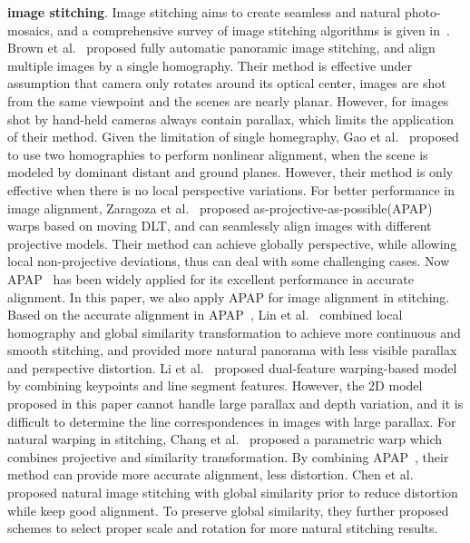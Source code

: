 \documentclass[10pt,journal,compsoc]{IEEEtran}
\begin{document}
\textbf{image stitching}.
Image stitching aims to create seamless and natural photo-mosaics, and a comprehensive survey of image stitching algorithms is given in~\cite{journals/ftcgv/Szeliski06}.
Brown et al.~\cite{journals/ijcv/BrownL07} proposed fully automatic panoramic image stitching, and align multiple images by a single homography. Their method is effective under assumption that camera only rotates around its optical center, images are shot from the same viewpoint and the scenes are nearly planar. However, for images shot by hand-held cameras always contain parallax, which limits the application of their method.
Given the limitation of single homegraphy, Gao et al.~\cite{conf/CVPR/GaoKB11} proposed to use two homographies to perform nonlinear alignment, when the scene is modeled by dominant distant and ground planes. However, their method is only effective when there is no local perspective variations.
For better performance in image alignment, Zaragoza et al.~\cite{journals/pami/ZaragozaCTBS14} proposed as-projective-as-possible(APAP) warps based on moving DLT, and can seamlessly align images with different projective models. Their method can achieve globally perspective, while allowing local non-projective deviations, thus can deal with some challenging cases. Now APAP~\cite{journals/pami/ZaragozaCTBS14}  has been widely applied for its excellent performance in accurate alignment. In this paper, we also apply APAP for image alignment in stitching.
Based on the accurate alignment in APAP~\cite{journals/pami/ZaragozaCTBS14}, Lin et al.~\cite{conf/CVPR/LinPRA15} combined local homography and global similarity transformation to achieve more continuous and smooth stitching, and provided more natural panorama with less visible parallax and perspective distortion.
Li et al.~\cite{conf/ICCV/LiY0Q15} proposed dual-feature warping-based model by combining keypoints and line segment features. However, the 2D model proposed in this paper cannot handle large parallax and depth variation, and it is difficult to determine the line correspondences in images with large parallax.
For natural warping in stitching, Chang et al.~\cite{conf/cvpr/ChangSC14} proposed a parametric warp which combines projective and similarity transformation. By combining APAP~\cite{journals/pami/ZaragozaCTBS14}, their method can provide more accurate alignment, less distortion.
Chen et al.~\cite{conf/eccv/ChenC16} proposed natural image stitching with global similarity prior to reduce distortion while keep good alignment.
To preserve global similarity, they further proposed schemes to select proper scale and rotation for more natural stitching results.
\end{document}
